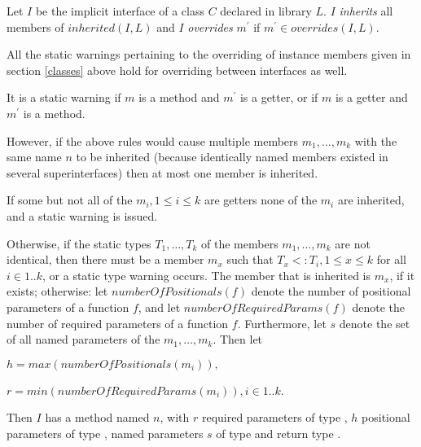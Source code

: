 \documentclass{article}
\begin{document}
\LMHash{}
Let $I$ be the implicit interface of a class $C$ declared in library $L$.
$I$ {\em inherits} all members of $inherited(I, L)$ and $I$ {\em overrides} $m^\prime$ if $m^\prime \in overrides(I, L)$.

\LMHash{}
All the static warnings pertaining to the overriding of instance members given in section \ref{classes} above hold for overriding between interfaces as well.

\LMHash{}
It is a static warning if $m$ is a method and $m^\prime$ is a getter, or if $m$ is a getter and $m^\prime$ is a method.




\LMHash{}
However, if the above rules would cause multiple members $m_1, \ldots, m_k$ with the same name $n$ to be inherited (because identically named members existed in several superinterfaces) then at most one member is inherited.

\LMHash{}
If some but not all of the $m_i, 1 \le i \le k$ are getters none of the $m_i$ are inherited, and a static warning is issued.

\LMHash{}
Otherwise, if the static types $T_1, \ldots, T_k$ of the members $m_1, \ldots, m_k$ are not identical, then there must be a member $m_x$ such that $T_x <: T_i, 1 \le x \le k$ for all $i \in 1 .. k$, or a static type warning occurs.
The member that is inherited is $m_x$, if it exists; otherwise:
let $numberOfPositionals(f)$ denote the number of positional parameters of a function $f$, and let $numberOfRequiredParams(f)$ denote the number of required parameters of a function $f$.
Furthermore, let $s$ denote the set of all named parameters of the $m_1, \ldots, m_k$.
Then let

$h = max(numberOfPositionals(m_i)), $

$r = min(numberOfRequiredParams(m_i)), i \in 1 .. k$.

\LMHash{}
Then $I$ has a method named $n$, with $r$ required parameters of type \DYNAMIC{}, $h$ positional parameters of type \DYNAMIC{}, named parameters $s$ of type \DYNAMIC{} and return type \DYNAMIC{}.
\end{document}
